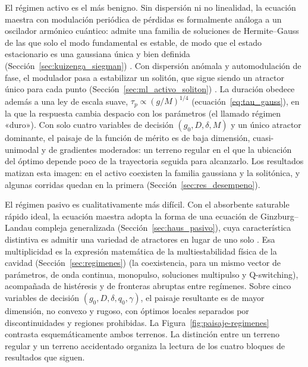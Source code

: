 El régimen activo es el más benigno. Sin dispersión ni no linealidad, la ecuación
maestra con modulación periódica de pérdidas es formalmente análoga a un oscilador
armónico cuántico: admite una familia de soluciones de Hermite--Gauss de las que solo
el modo fundamental es estable, de modo que el estado estacionario es una gaussiana
única y bien definida (Sección~\ref{sec:kuizenga_siegman}) \cite{KuizengaSiegman1970,Keller2022}. Con dispersión anómala y
automodulación de fase, el modulador pasa a estabilizar un solitón, que sigue siendo
un atractor único para cada punto (Sección~\ref{sec:ml_activo_soliton}) \cite{Kaertner2020}. La duración obedece además a una ley de escala
suave, $\tau_p\propto(g/M)^{1/4}$ (ecuación~\eqref{eq:tau_gauss}), en la que la respuesta cambia despacio con los
parámetros (el llamado régimen «duro»). Con solo cuatro variables de decisión
$(g_0,D,\delta,M)$ y un único atractor dominante, el paisaje de la función de mérito es
de baja dimensión, cuasi-unimodal y de gradientes moderados: un terreno regular en el
que la ubicación del óptimo depende poco de la trayectoria seguida para alcanzarlo. Los
resultados matizan esta imagen: en el activo coexisten la familia gaussiana y la
solitónica, y algunas corridas quedan en la primera (Sección~\ref{sec:res_desempeno}).

El régimen pasivo es cualitativamente más difícil. Con el absorbente saturable rápido
ideal, la ecuación maestra adopta la forma de una ecuación de Ginzburg--Landau compleja
generalizada (Sección~\ref{sec:haus_pasivo}), cuya característica distintiva es admitir una variedad de atractores en
lugar de uno solo \cite{Kaertner2020,GreluAkhmediev2012}. Esa multiplicidad es la
expresión matemática de la multiestabilidad física de la cavidad (Sección~\ref{sec:regimenes}) (la coexistencia, para
un mismo vector de parámetros, de onda continua, monopulso, soluciones multipulso y
Q-switching), acompañada de histéresis y de fronteras abruptas entre regímenes. Sobre
cinco variables de decisión $(g_0,D,\delta,q_0,\gamma)$, el paisaje resultante es de mayor
dimensión, no convexo y rugoso, con óptimos locales separados por discontinuidades y
regiones prohibidas. La Figura~\ref{fig:paisaje-regimenes} contrasta esquemáticamente
ambos terrenos. La distinción entre un terreno regular y un terreno accidentado
organiza la lectura de los cuatro bloques de resultados que siguen.

